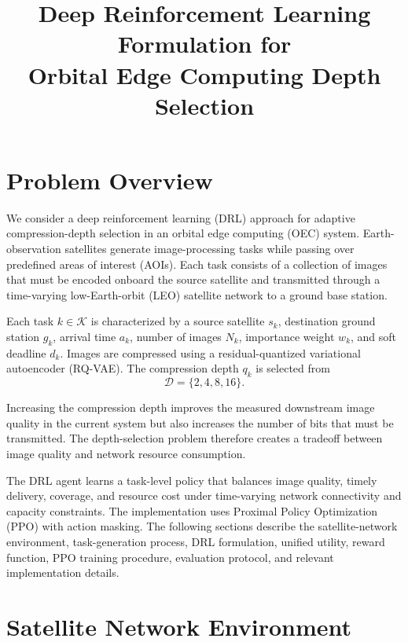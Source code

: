 \documentclass[11pt]{article}
\title{Deep Reinforcement Learning Formulation for\\
Orbital Edge Computing Depth Selection}
\author{}
\date{}
\begin{document}
\maketitle

\section{Problem Overview}

We consider a deep reinforcement learning (DRL) approach for adaptive
compression-depth selection in an orbital edge computing (OEC) system.
Earth-observation satellites generate image-processing tasks while passing
over predefined areas of interest (AOIs). Each task consists of a collection
of images that must be encoded onboard the source satellite and transmitted
through a time-varying low-Earth-orbit (LEO) satellite network to a ground
base station.

Each task $k \in \mathcal{K}$ is characterized by a source satellite $s_k$,
destination ground station $g_k$, arrival time $a_k$, number of images $N_k$,
importance weight $w_k$, and soft deadline $d_k$. Images are compressed using
a residual-quantized variational autoencoder (RQ-VAE). The compression depth
$q_k$ is selected from
\[
\mathcal{D} = \{2,4,8,16\}.
\]

Increasing the compression depth improves the measured downstream image
quality in the current system but also increases the number of bits that must
be transmitted. The depth-selection problem therefore creates a tradeoff
between image quality and network resource consumption.

The DRL agent learns a task-level policy that balances image quality, timely
delivery, coverage, and resource cost under time-varying network connectivity
and capacity constraints. The implementation uses Proximal Policy
Optimization (PPO) with action masking. The following sections describe the
satellite-network environment, task-generation process, DRL formulation,
unified utility, reward function, PPO training procedure, evaluation
protocol, and relevant implementation details.


\section{Satellite Network Environment}
\end{document}
